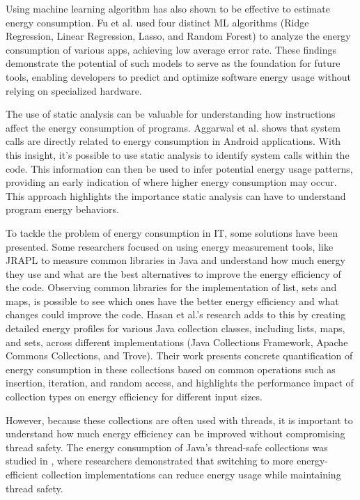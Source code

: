 \documentclass[sigplan]{acmart}
\begin{document}
Using machine learning algorithm has also shown to be effective to estimate energy consumption. Fu et al.\cite{8726531} used four distinct ML algorithms (Ridge Regression, Linear Regression, Lasso, and Random Forest) to analyze the energy consumption of various apps, achieving low average error rate. These findings demonstrate the potential of such models to serve as the foundation for future tools, enabling developers to predict and optimize software energy usage without relying on specialized hardware.

The use of static analysis can be valuable for understanding how instructions affect the energy consumption of programs. Aggarwal et al.\cite{aggarwal2014power} shows that system calls are directly related to energy consumption in Android applications. With this insight, it's possible to use static analysis to identify system calls within the code. This information can then be used to infer potential energy usage patterns, providing an early indication of where higher energy consumption may occur. This approach highlights the importance static analysis can have to understand program energy behaviors.

To tackle the problem of energy consumption in IT, some solutions have been presented. Some researchers focused on using energy measurement tools, like JRAPL to measure common libraries in Java and understand how much energy they use and what are the best alternatives to improve the energy efficiency of the code\cite{10.1145/2896967.2896968}. Observing common libraries for the implementation of list, sets and maps, is possible to see which ones have the better energy efficiency and what changes could improve the code.
Hasan et al.'s \cite{10.1145/2884781.2884869} research adds to this by creating detailed energy profiles for various Java collection classes, including lists, maps, and sets, across different implementations (Java Collections Framework, Apache Commons Collections, and Trove). Their work presents concrete quantification of energy consumption in these collections based on common operations such as insertion, iteration, and random access, and highlights the performance impact of collection types on energy efficiency for different input sizes.

However, because these collections are often used with threads, it is important to understand how much energy efficiency can be improved without compromising thread safety. The energy consumption of Java's thread-safe collections was studied in \cite{7816451}, where researchers demonstrated that switching to more energy-efficient collection implementations can reduce energy usage while maintaining thread safety.
\end{document}

